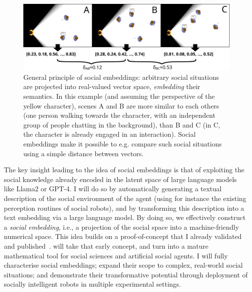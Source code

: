 \begin{figure}[H]
    \centering
    \includegraphics[width=0.9\linewidth]{figs/social-embeddings}
    \caption{General principle of social embeddings: arbitrary social situations
    are projected into real-valued vector space, \emph{embedding} their
    semantics. In this example (and assuming the perspective of the yellow
    character), scenes A and B  are more similar to each others (one person
    walking towards the character, with an independent group of people chatting
    in the background), than B and C (in C, the character is already engaged in
    an interaction).  Social embeddings make it possible to e.g. compare such
    social situations using a simple distance between vectors.}

    \label{fig:social-embeddings}
\end{figure}


The key insight leading to the idea of social embeddings is that of exploiting
the social knowledge already encoded in the latent space of large language
models like Llama2 or GPT-4. I will do so by automatically generating a textual
description of the social environment of the agent (using for instance the
existing perception routines of social robots), and by transforming this
description into a text embedding via a large language model.  By doing so, we
effectively construct a \emph{social embedding}, i.e., a projection of the
social space into a machine-friendly numerical space.  This idea builds on a
proof-of-concept that I already validated and
published~\cite{lemaignan2024social}. \project will take that early concept, and
turn into a mature mathematical tool for social sciences and artificial social
agents. I will fully characterise social embeddings; expand their scope to
complex, real-world social situations; and demonstrate their transformative
potential through deployment of socially intelligent robots in multiple
experimental settings.

